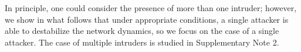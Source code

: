 \documentclass[%
 reprint,
 amsmath,amssymb,
 aip,
]{revtex4-2}
\theoremstyle{italichead}
\theoremstyle{definition}
\begin{document}
{




{
In principle, one could consider the presence of more than one intruder; however, we show in what follows that under appropriate conditions, a single attacker is able to destabilize the network dynamics, so we focus on the case of a single attacker.} {The case of multiple intruders is studied in Supplementary Note 2.}



}
\end{document}
